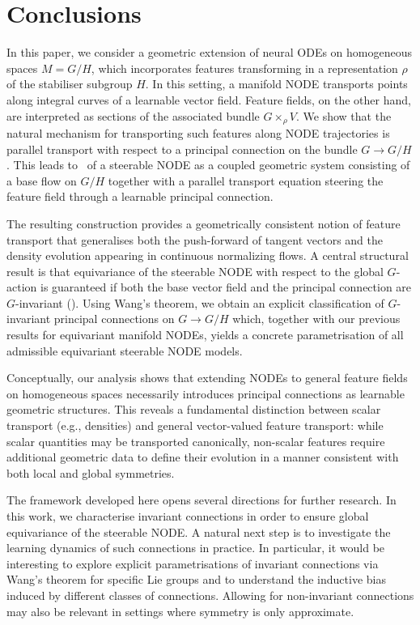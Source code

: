 \documentclass[12pt,a4paper]{article}
\numberwithin{equation}{section}
\theoremstyle{plain}
\theoremstyle{definition}
\theoremstyle{remark}
\begin{document}
\section{Conclusions}
\label{sec:conclusions}

In this paper, we consider a geometric extension of neural ODEs on homogeneous spaces $M = G/H$, which incorporates features transforming in a representation $\rho$ of the stabiliser subgroup $H$. In this setting, a manifold NODE transports points along integral curves of a learnable vector field. Feature fields, on the other hand, are interpreted as sections of the associated bundle $G \times_\rho V$. We show that the natural mechanism for transporting such features along NODE trajectories is parallel transport with respect to a principal connection on the bundle $G \to G/H$. This leads to~ of a steerable NODE as a coupled geometric system consisting of a base flow on $G/H$ together with a parallel transport equation steering the feature field through a learnable principal connection.

The resulting construction provides a geometrically consistent notion of feature transport that generalises both the push-forward of tangent vectors and the density evolution appearing in continuous normalizing flows. A central structural result is that equivariance of the steerable NODE with respect to the global $G$-action is guaranteed if both the base vector field and the principal connection are $G$-invariant (). Using Wang’s theorem, we obtain an explicit classification of $G$-invariant principal connections on $G \to G/H$ which, together with our previous results for equivariant manifold NODEs, yields a concrete parametrisation of all admissible equivariant steerable NODE models.

Conceptually, our analysis shows that extending NODEs to general feature fields on homogeneous spaces necessarily introduces principal connections as learnable geometric structures. This reveals a fundamental distinction between scalar transport (e.g., densities) and general vector-valued feature transport: while scalar quantities may be transported canonically, non-scalar features require additional geometric data to define their evolution in a manner consistent with both local and global symmetries.

The framework developed here opens several directions for further research. In this work, we characterise invariant connections in order to ensure global equivariance of the steerable NODE. A natural next step is to investigate the learning dynamics of such connections in practice. In particular, it would be interesting to explore explicit parametrisations of invariant connections via Wang’s theorem for specific Lie groups and to understand the inductive bias induced by different classes of connections. Allowing for non-invariant connections may also be relevant in settings where symmetry is only approximate.
\end{document}
